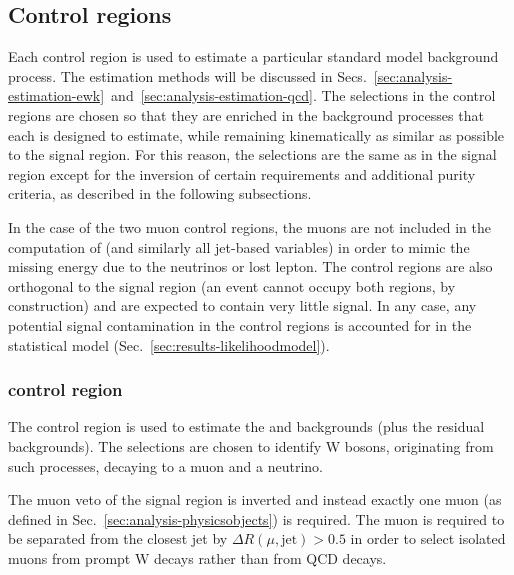 \subsection{Control regions}
\label{sec:analysis-eventselection-cr}
Each control region is used to estimate a particular standard model background 
process. The estimation methods will be discussed in 
Secs.~\ref{sec:analysis-estimation-ewk}~and~\ref{sec:analysis-estimation-qcd}.
The selections in the control regions are chosen so that they are enriched in 
the background processes that each is designed to estimate, while remaining 
kinematically as similar as possible to the signal region. 
For this reason, the 
selections are the same as in the signal region except for the inversion of 
certain requirements and additional purity criteria, as described in the 
following subsections.

In the case of the two muon control regions, the muons are not included in the 
computation of \met (and similarly all jet-based variables) in order to mimic 
the missing energy due to the neutrinos or lost lepton.
The control regions are also orthogonal to the signal 
region (an event cannot occupy both regions, by construction) and are expected 
to contain very little signal. In any case, any potential signal contamination 
in the control regions is accounted for in the statistical model 
(Sec.~\ref{sec:results-likelihoodmodel}).



\subsubsection{\mj control region}

The \mj control region is used to estimate the \wlj and \ttbar backgrounds 
(plus the residual backgrounds).
The selections are chosen to identify W bosons, originating from such 
processes, decaying to a muon and a neutrino. 

The muon veto of the signal 
region is inverted and instead exactly one muon (as defined in 
Sec.~\ref{sec:analysis-physicsobjects}) is required. The muon is required to be 
separated from the closest jet by $\Delta R(\mu,\mathrm{jet}) > 0.5$ in order 
to select isolated muons from prompt W decays rather than from QCD decays.


